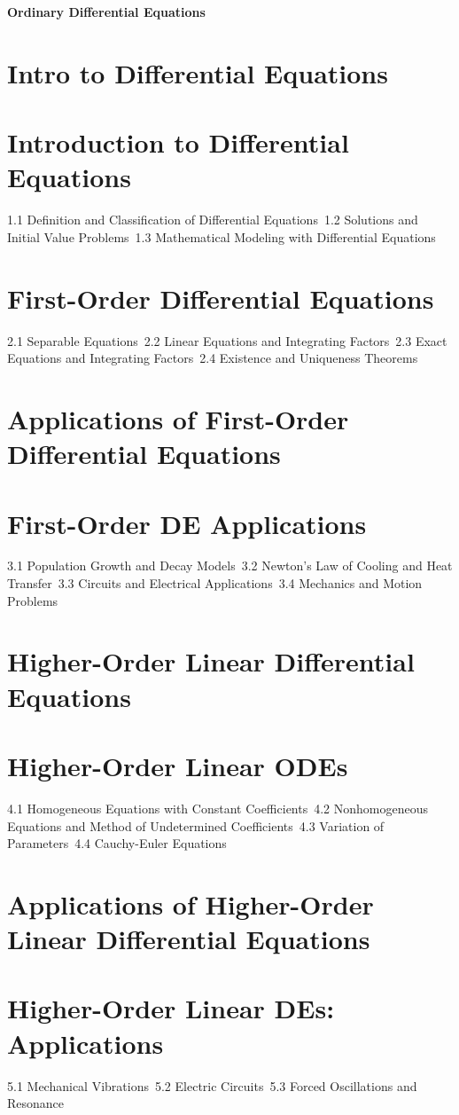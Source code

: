 {\LARGE \bf{Ordinary Differential Equations}}
\section{Intro to Differential Equations}
\section{Introduction to Differential Equations}
1.1 Definition and Classification of Differential Equations\
1.2 Solutions and Initial Value Problems\
1.3 Mathematical Modeling with Differential Equations\
\section{First-Order Differential Equations}
2.1 Separable Equations\
2.2 Linear Equations and Integrating Factors\
2.3 Exact Equations and Integrating Factors\
2.4 Existence and Uniqueness Theorems\
\section{Applications of First-Order Differential Equations}
\section{First-Order DE Applications}
3.1 Population Growth and Decay Models\
3.2 Newton's Law of Cooling and Heat Transfer\
3.3 Circuits and Electrical Applications\
3.4 Mechanics and Motion Problems\
\section{Higher-Order Linear Differential Equations}
\section{Higher-Order Linear ODEs}
4.1 Homogeneous Equations with Constant Coefficients\
4.2 Nonhomogeneous Equations and Method of Undetermined Coefficients\
4.3 Variation of Parameters\
4.4 Cauchy-Euler Equations\
\section{Applications of Higher-Order Linear Differential Equations}
\section{Higher-Order Linear DEs: Applications}
5.1 Mechanical Vibrations\
5.2 Electric Circuits\
5.3 Forced Oscillations and Resonance\
